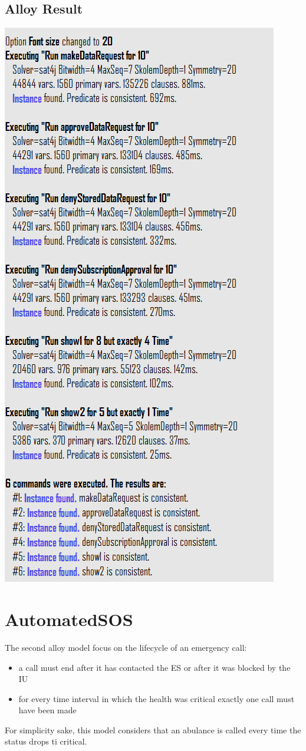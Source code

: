 \subsection{Alloy Result}
\includegraphics[height = 0.8\textheight]{sections/alloy/resultD4H.png}
\clearpage
\section{AutomatedSOS}
The second alloy model focus on the lifecycle of an emergency call:
\begin{itemize}
\item a call must end after it has contacted the ES or after it was blocked by the IU
\item for every time interval in which the health was critical exactly one call must have been made
\end{itemize}
For simplicity sake, this model considers that an abulance is called every time the status drops ti critical.
